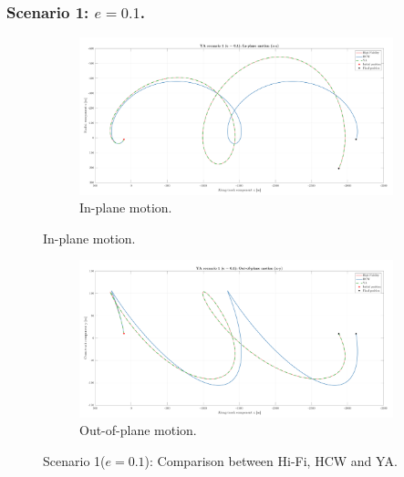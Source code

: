 		\subsubsection{Scenario 1: $e = 0.1$.}
%		
		\begin{figure}[!htb]
		\begin{changemargin}{-2.2cm}{-1cm}
		\begin{adjustbox}{width=1.2\textwidth}
		\centering
		\medskip
		\begin{subfigure}[t]{1.1\linewidth}
		\centering\includegraphics[width=\linewidth]{Chapters/Chapter_03/YA_scenario_1_(e___0_1)_IP}
		\caption{In-plane motion.}
		\label{figCh3:Scenario1_IP}
		\end{subfigure}
		\end{adjustbox}
		\end{changemargin}
		\end{figure}
		\begin{figure}
		\begin{changemargin}{-2.2cm}{-1cm}
		\begin{adjustbox}{width=1.2\textwidth}
		\ContinuedFloat
		\centering
		\begin{subfigure}[t]{1.2\linewidth}
		\centering\includegraphics[width=\linewidth]{Chapters/Chapter_03/YA_scenario_1_(e___0_1)_OOP}
		\caption{Out-of-plane motion.}
		\label{figCh3:Scenario1_OOP}
		\end{subfigure}
		\end{adjustbox}
		\end{changemargin}
		\caption{Scenario 1($e= 0.1$): Comparison between Hi-Fi, HCW and YA. }
		\label{figCh3:Scenario1}
		\end{figure}
		\FloatBarrier
